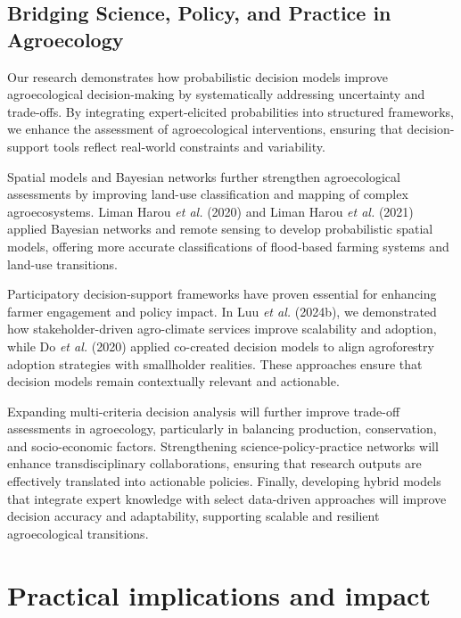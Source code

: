 \documentclass[
]{article}
\begin{document}
\hypertarget{bridging-science-policy-and-practice-in-agroecology}{%
\subsection{Bridging Science, Policy, and Practice in
Agroecology}\label{bridging-science-policy-and-practice-in-agroecology}}

Our research demonstrates how probabilistic decision models improve
agroecological decision-making by systematically addressing uncertainty
and trade-offs. By integrating expert-elicited probabilities into
structured frameworks, we enhance the assessment of agroecological
interventions, ensuring that decision-support tools reflect real-world
constraints and variability.

Spatial models and Bayesian networks further strengthen agroecological
assessments by improving land-use classification and mapping of complex
agroecosystems. Liman Harou \emph{et al.} (2020) and Liman Harou
\emph{et al.} (2021) applied Bayesian networks and remote sensing to
develop probabilistic spatial models, offering more accurate
classifications of flood-based farming systems and land-use transitions.

Participatory decision-support frameworks have proven essential for
enhancing farmer engagement and policy impact. In Luu \emph{et al.}
(2024b), we demonstrated how stakeholder-driven agro-climate services
improve scalability and adoption, while Do \emph{et al.} (2020) applied
co-created decision models to align agroforestry adoption strategies
with smallholder realities. These approaches ensure that decision models
remain contextually relevant and actionable.

Expanding multi-criteria decision analysis will further improve
trade-off assessments in agroecology, particularly in balancing
production, conservation, and socio-economic factors. Strengthening
science-policy-practice networks will enhance transdisciplinary
collaborations, ensuring that research outputs are effectively
translated into actionable policies. Finally, developing hybrid models
that integrate expert knowledge with select data-driven approaches will
improve decision accuracy and adaptability, supporting scalable and
resilient agroecological transitions.

\newpage

\hypertarget{practical-implications-and-impact}{%
\section{Practical implications and
impact}\label{practical-implications-and-impact}}
\end{document}
